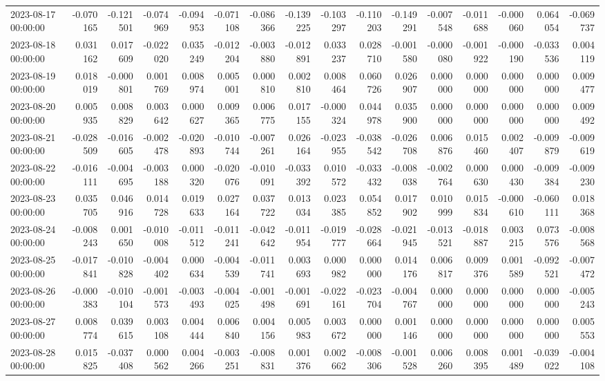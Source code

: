 \begin{tabular}{lrrrrrrrrrrrrrrr}
2023-08-17 00:00:00 & -0.070165 & -0.121501 & -0.074969 & -0.094953 & -0.071108 & -0.086366 & -0.139225 & -0.103297 & -0.110203 & -0.149291 & -0.007548 & -0.011688 & -0.000060 & 0.064054 & -0.069737 \\
2023-08-18 00:00:00 & 0.031162 & 0.017609 & -0.022020 & 0.035249 & -0.012204 & -0.003880 & -0.012891 & 0.033237 & 0.028710 & -0.001580 & -0.000080 & -0.001922 & -0.000190 & -0.033536 & 0.004119 \\
2023-08-19 00:00:00 & 0.018019 & -0.000801 & 0.001769 & 0.008974 & 0.005001 & 0.000810 & 0.002810 & 0.008464 & 0.060726 & 0.026907 & 0.000000 & 0.000000 & 0.000000 & 0.000000 & 0.009477 \\
2023-08-20 00:00:00 & 0.005935 & 0.008829 & 0.003642 & 0.000627 & 0.009365 & 0.006775 & 0.017155 & -0.000324 & 0.044978 & 0.035900 & 0.000000 & 0.000000 & 0.000000 & 0.000000 & 0.009492 \\
2023-08-21 00:00:00 & -0.028509 & -0.016605 & -0.002478 & -0.020893 & -0.010744 & -0.007261 & 0.026164 & -0.023955 & -0.038542 & -0.026708 & 0.006876 & 0.015460 & 0.002407 & -0.009879 & -0.009619 \\
2023-08-22 00:00:00 & -0.016111 & -0.004695 & -0.003188 & 0.000320 & -0.020076 & -0.010091 & -0.033392 & 0.010572 & -0.033432 & -0.008038 & -0.002764 & 0.000630 & 0.000430 & -0.009384 & -0.009230 \\
2023-08-23 00:00:00 & 0.035705 & 0.046916 & 0.014728 & 0.019633 & 0.027164 & 0.037722 & 0.013034 & 0.023385 & 0.054852 & 0.017902 & 0.010999 & 0.015834 & -0.000610 & -0.060111 & 0.018368 \\
2023-08-24 00:00:00 & -0.008243 & 0.001650 & -0.010008 & -0.011512 & -0.011241 & -0.042642 & -0.011954 & -0.019777 & -0.028664 & -0.021945 & -0.013521 & -0.018887 & 0.003215 & 0.073576 & -0.008568 \\
2023-08-25 00:00:00 & -0.017841 & -0.010828 & -0.004402 & 0.000634 & -0.004539 & -0.011741 & 0.003693 & 0.000982 & 0.000000 & 0.014176 & 0.006817 & 0.009376 & 0.001589 & -0.092521 & -0.007472 \\
2023-08-26 00:00:00 & -0.000383 & -0.010104 & -0.001573 & -0.003493 & -0.004025 & -0.001498 & -0.001691 & -0.022161 & -0.023704 & -0.004767 & 0.000000 & 0.000000 & 0.000000 & 0.000000 & -0.005243 \\
2023-08-27 00:00:00 & 0.008774 & 0.039615 & 0.003108 & 0.004444 & 0.006840 & 0.004156 & 0.005983 & 0.003672 & 0.000000 & 0.001146 & 0.000000 & 0.000000 & 0.000000 & 0.000000 & 0.005553 \\
2023-08-28 00:00:00 & 0.015825 & -0.037408 & 0.000562 & 0.004266 & -0.003251 & -0.008831 & 0.001376 & 0.002662 & -0.008306 & -0.001528 & 0.006260 & 0.008395 & 0.001489 & -0.039022 & -0.004108 \\

\end{tabular}
